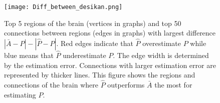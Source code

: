 \documentclass[a4paper]{article}
\begin{document}
\begin{figure}[!htb]
\centering
\texttt{[image: Diff\_between\_desikan.png]}
\caption{Top 5 regions of the brain (vertices in graphs) and top 50 connections between regions (edges in graphs) with largest difference $|\bar{A} - P| - |\hat{P} - P|$. Red edges indicate that $\hat{P}$ overestimate $P$ while blue means that $\hat{P}$ underestimate $P$. The edge width is determined by the estimation error. Connections with larger estimation error are represented by thicker lines. This figure shows the regions and connections of the brain where $\hat{P}$ outperforms $\bar{A}$ the most for estimating $P$.}
\label{fig:Diff_between_desikan}
\end{figure}


%
%
\end{document}
